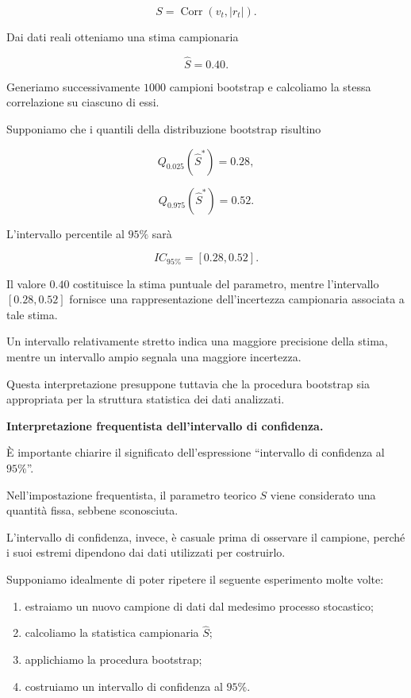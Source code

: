 \[
S=
\operatorname{Corr}(v_t,|r_t|).
\]

Dai dati reali otteniamo una stima campionaria

\[
\widehat{S}=0.40.
\]

Generiamo successivamente $1000$ campioni bootstrap
e calcoliamo la stessa correlazione su ciascuno
di essi.

Supponiamo che i quantili della distribuzione
bootstrap risultino

\[
Q_{0.025}(\widehat{S}^*)=0.28,
\]

\[
Q_{0.975}(\widehat{S}^*)=0.52.
\]

L'intervallo percentile al $95\%$ sarà

\[
\boxed{
IC_{95\%}=[0.28,0.52].
}
\]

Il valore $0.40$ costituisce la stima puntuale
del parametro, mentre l'intervallo $[0.28,0.52]$
fornisce una rappresentazione dell'incertezza
campionaria associata a tale stima.

Un intervallo relativamente stretto indica
una maggiore precisione della stima,
mentre un intervallo ampio segnala
una maggiore incertezza.

Questa interpretazione presuppone tuttavia
che la procedura bootstrap sia appropriata
per la struttura statistica dei dati analizzati.

\medskip

\noindent
\textbf{Interpretazione frequentista dell'intervallo
di confidenza.}

È importante chiarire il significato
dell'espressione ``intervallo di confidenza al $95\%$''.

Nell'impostazione frequentista, il parametro
teorico $S$ viene considerato una quantità
fissa, sebbene sconosciuta.

L'intervallo di confidenza, invece, è casuale
prima di osservare il campione, perché i suoi
estremi dipendono dai dati utilizzati
per costruirlo.

Supponiamo idealmente di poter ripetere
il seguente esperimento molte volte:

\begin{enumerate}
    \item estraiamo un nuovo campione di dati
    dal medesimo processo stocastico;

    \item calcoliamo la statistica campionaria
    $\widehat{S}$;

    \item applichiamo la procedura bootstrap;

    \item costruiamo un intervallo di confidenza
    al $95\%$.
\end{enumerate}

